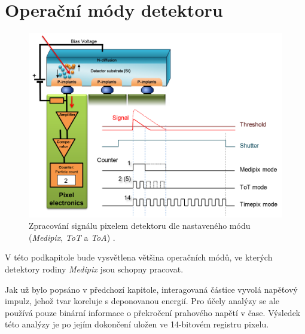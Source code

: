 \section{Operační módy detektoru}\label{chap:detectors:operation_modes}
\begin{figure}[th]
	\begin{center}
		\includegraphics[width=14cm]{figures/det_pix.png}
		\caption{Zpracování signálu pixelem detektoru dle nastaveného módu (\textit{Medipix}, \textit{ToT} a \textit{ToA}) \cite{PlatkevicDisertace}.}
		\label{fig:det:modes}
	\end{center}
\end{figure}


V této podkapitole bude vysvětlena většina operačních módů, ve kterých detektory rodiny \textit{Medipix} jsou schopny pracovat. 

Jak už bylo popsáno v předchozí kapitole, interagovaná částice vyvolá napěťový impulz, jehož tvar koreluje s deponovanou energií. Pro účely analýzy se ale používá pouze binární informace o překročení prahového napětí v čase. Výsledek této analýzy je po jejím dokončení uložen ve 14-bitovém registru pixelu.

